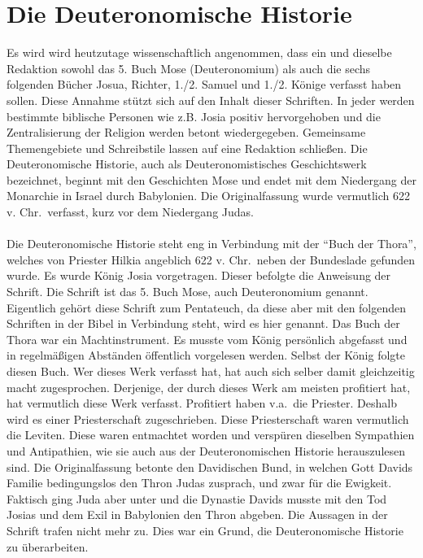 \section{Die Deuteronomische Historie}
Es wird wird heutzutage wissenschaftlich angenommen, dass ein und dieselbe Redaktion sowohl das 5. Buch Mose (Deuteronomium) als auch die sechs folgenden Bücher Josua, Richter, 1./2. Samuel und 1./2. Könige verfasst haben sollen. Diese Annahme stützt sich auf den Inhalt dieser Schriften. In jeder werden bestimmte biblische Personen wie  z.B. Josia positiv hervorgehoben und die Zentralisierung der Religion werden betont wiedergegeben. Gemeinsame Themengebiete und Schreibstile lassen auf eine Redaktion schließen. Die Deuteronomische Historie, auch als Deuteronomistisches Geschichtswerk bezeichnet, beginnt mit den Geschichten Mose und endet mit dem Niedergang der Monarchie in Israel durch Babylonien. Die Originalfassung wurde vermutlich 622 v. Chr.\ verfasst, kurz vor dem Niedergang Judas.
\\~\\
Die Deuteronomische Historie steht eng in Verbindung mit der ``Buch der Thora'', welches von Priester Hilkia angeblich 622 v. Chr.\ neben der Bundeslade gefunden wurde. Es wurde König Josia vorgetragen. Dieser befolgte die Anweisung der Schrift. Die Schrift ist das 5. Buch Mose, auch Deuteronomium genannt. Eigentlich gehört diese Schrift zum Pentateuch, da diese aber mit den folgenden Schriften in der Bibel in Verbindung steht, wird es hier genannt. Das Buch der Thora war ein Machtinstrument. Es musste vom König persönlich abgefasst und in regelmäßigen Abständen öffentlich vorgelesen werden. Selbst der König folgte diesen Buch. Wer dieses Werk verfasst hat, hat auch sich selber damit gleichzeitig macht zugesprochen. Derjenige, der durch dieses Werk am meisten profitiert hat, hat vermutlich diese Werk verfasst. Profitiert haben v.a.\ die Priester.  Deshalb wird es einer Priesterschaft zugeschrieben. Diese Priesterschaft waren vermutlich die Leviten. Diese waren entmachtet worden und verspüren dieselben Sympathien und Antipathien, wie sie auch aus der Deuteronomischen Historie herauszulesen sind. Die Originalfassung betonte den Davidischen Bund, in welchen Gott Davids Familie bedingungslos den Thron Judas zusprach, und zwar für die Ewigkeit. Faktisch ging Juda aber unter und die Dynastie Davids musste mit den Tod Josias und dem Exil in Babylonien den Thron abgeben. Die Aussagen in der Schrift trafen nicht mehr zu. Dies war ein Grund, die Deuteronomische Historie zu überarbeiten.
\\~\\
